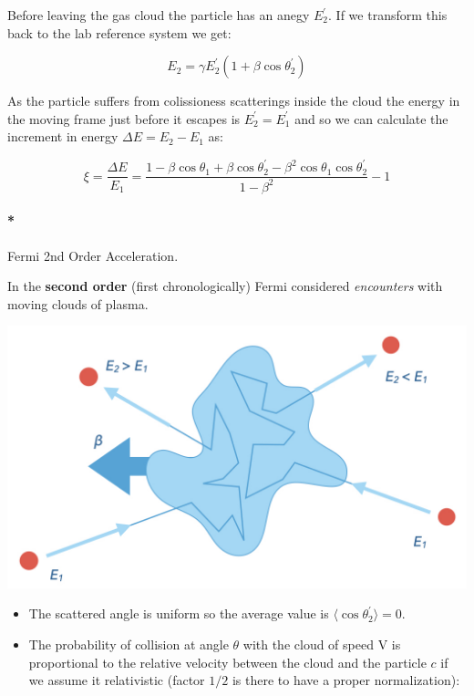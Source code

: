 \documentclass[
  letterpaper,
  DIV=11,
  numbers=noendperiod]{scrreprt}
\let\oldparagraph\paragraph
\renewcommand{\paragraph}[1]{\oldparagraph{#1}\mbox{}}
\begin{document}
Before leaving the gas cloud the particle has an anegy \(E_2^\prime\).
If we transform this back to the lab reference system we get:

\[E_2 = \gamma E_2^\prime (1 +\beta \cos\theta_2^\prime)\]

As the particle suffers from colissioness scatterings inside the cloud
the energy in the moving frame just before it escapes is
\(E_2^\prime = E_1^\prime\) and so we can calculate the increment in
energy \(\Delta E = E_2 - E_1\) as:

\[\xi = \frac{\Delta E}{E_1}  = \frac{1 - \beta \cos \theta_1 + \beta\cos\theta_2^\prime - \beta^2\cos\theta_1\cos\theta_2^\prime}{1 - \beta^2} -1\]

\paragraph*{Fermi 2nd Order
Acceleration.}\label{fermi-2nd-order-acceleration.}

In the \textbf{second order} (first chronologically) Fermi considered
\emph{encounters} with moving clouds of plasma.

\includegraphics{images/Fermi2nd.jpg}

\begin{itemize}
\item
  The scattered angle is uniform so the average value is
  \(\langle \cos\theta_2^\prime\rangle = 0\).
\item
  The probability of collision at angle \(\theta\) with the cloud of
  speed V is proportional to the relative velocity between the cloud and
  the particle \(c\) if we assume it relativistic (factor \(1/2\) is
  there to have a proper normalization):
\end{itemize}
\end{document}
